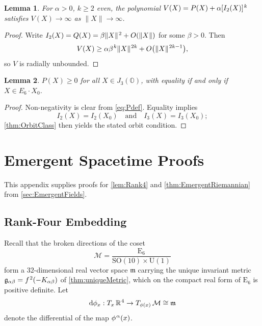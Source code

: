 \documentclass[pdflatex,sn-mathphys-num]{sn-jnl}
\theoremstyle{thmstyleone}
\newtheorem{lemma}[lemma]{Lemma}
\theoremstyle{thmstyletwo}%
\theoremstyle{thmstylethree}%
\newcommand{\SO}[1]{\mathrm{SO(#1)}}
\newcommand{\U}[1]{\mathrm{U(#1)}}
\newcommand{\E}[1]{\mathrm{E_{#1}}}
\newcommand{\M}{\mathcal{M}}
\newcommand{\jalg}{J_3(\mathbb{O})}
\newcommand{\SOTen}{\SO{10}}
\newcommand{\UOne}{\U{1}}
\newcommand{\ESix}{\E{6}}
\newcommand{\SOTenXUOne}{\SOTen \times \UOne}
\newcommand{\MCoset}{\frac{\ESix}{\SOTenXUOne}}
\newcommand{\sm}{\hspace{.065em}}
\newcommand{\smexp}[1]{^{\sm #1}}
\begin{document}
\begin{appendices}
\begin{lemma}\label{lem:A-coercive}
For $\alpha>0$, $k\ge2$ even, the polynomial
$V(X)=P(X)+\alpha[I_{2}(X)]\smexp{k}$ satisfies
$V(X)\to\infty$ as $\|X\|\to\infty$.
\end{lemma}

\begin{proof}
Write $I_{2}(X)=Q(X)=\beta\|X\|\smexp{2}+O(\|X\|)$ for some $\beta>0$.  
Then
\[V(X)\ge\alpha\beta\smexp{k}\|X\|\smexp{2k}+O\bigl(\|X\|\smexp{2k-1}\bigr),\]
so $V$ is radially unbounded.
\end{proof}

\begin{lemma}\label{lem:A-sumsq}
$P(X)\ge0$ for all $X\in\jalg$, with equality if and only if $X\in E_{6} \cdot X_{0}$.
\end{lemma}

\begin{proof}
Non-negativity is clear from \eqref{eq:Pdef}.  
Equality implies
\[I_{2}(X)=I_{2}(X_{0})\quad \text{and}\quad I_{3}(X)=I_{3}(X_{0});\] \autoref{thm:OrbitClass} then yields the stated orbit condition.
\end{proof}

\section{Emergent Spacetime Proofs}
\label{app:Lorentz}

This appendix supplies proofs for \autoref{lem:Rank4} and \autoref{thm:EmergentRiemannian} from \autoref{sec:EmergentFields}.

\subsection{Rank-Four Embedding}
\label{app:Lorentz:Rank4}

Recall that the broken directions of the coset
\[
    \M = \MCoset
\]
form a $32$-dimensional real vector space
\(\mathfrak m\) carrying the unique invariant metric
\(\mathfrak g_{\alpha\beta}=f\smexp{2}(-K_{\alpha\beta})\) of
\autoref{thm:uniqueMetric}, which on the compact real form of \(\ESix\) is
positive definite. Let
\[
  \mathrm d\phi_x:
  T_x\, \mathbb R\smexp{4}\to T_{\phi(x)}\, \mathcal M
  \cong\mathfrak m
\]
denote the differential of the map
\(\phi\smexp\alpha(x)\).


\end{appendices}
\end{document}
